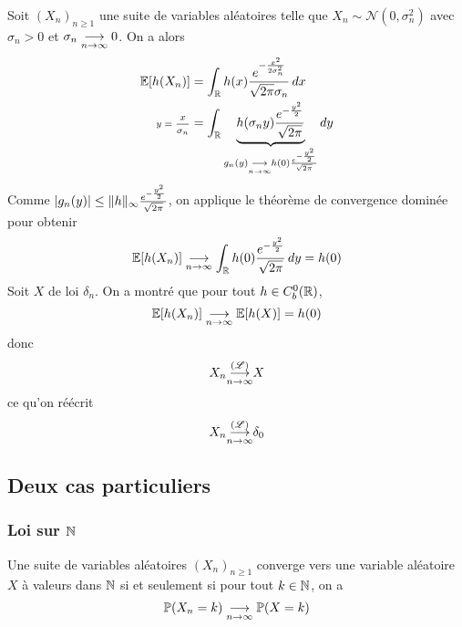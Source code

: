 \begin{example}
    Soit \({(X_n)}_{n\geq 1}\) une suite de variables aléatoires
    telle que \(X_n\sim\mathcal N(0,\sigma_n^2)\) avec \(\sigma_n> 0\)
    et \(\sigma_n\underset{n\to\infty}{\longrightarrow} 0\). On a alors
    \begin{equation*}
        \begin{aligned}
            \mathbb{E}[h(X_n)]
            &= \int_{\mathbb{R}} h(x) \frac{e^{-\frac{x^2}{2\sigma_n^2}}}{\sqrt{2\pi}\sigma_n}  \mathop{}\!{d} x\\
            \text{\scriptsize{\(y=\frac{x}{\sigma_n}\)}}&= \int_{\mathbb{R}} \underbrace{h(\sigma_n y) \frac{e^{-\frac{y^2}{2}}}{\sqrt{2\pi}}}_{g_n(y)\underset{n\to\infty}{\longrightarrow} h(0) \frac{e^{-\frac{y^2}{2}}}{\sqrt{2\pi}}} \mathop{}\!{d} y\\
        \end{aligned}
    \end{equation*}
    Comme \(|g_n(y)|\leq \mathopen{}\left\|h\right\|\mathclose{}_{\infty} \frac{e^{-\frac{y^2}{2}}}{\sqrt{2\pi}}\), on
    applique le théorème de convergence dominée pour obtenir
    \begin{equation*}
        \mathbb{E}[h(X_n)] \underset{n\to\infty}{\longrightarrow} \int_{\mathbb{R}} h(0) \frac{e^{-\frac{y^2}{2}}}{\sqrt{2\pi}} \mathop{}\!{d} y= h(0)
    \end{equation*}
    Soit \(X\) de loi \(\delta_n\). On a montré que pour tout \(h\in C_b^0(\mathbb{R})\),
    \begin{equation*}
        \mathbb{E}[h(X_n)] \underset{n\to\infty}{\longrightarrow} \mathbb{E}[h(X)]=h(0)
    \end{equation*}
    donc
    \begin{equation*}
        X_n \underset{n\to\infty}{{\overset{(\mathscr{L})}{\longrightarrow}}} X
    \end{equation*}
    ce qu'on réécrit
    \begin{equation*}
        X_n \underset{n\to\infty}{{\overset{(\mathscr{L})}{\longrightarrow}}} \delta_0
    \end{equation*}
\end{example}

\subsection{Deux cas particuliers}

\subsubsection{Loi sur \(\mathbb{N}\)}

\begin{proposition}
    Une suite de variables aléatoires \({(X_n)}_{n\geq 1}\) converge 
    vers une variable aléatoire \(X\) à valeurs dans \(\mathbb{N}\) si et seulement
    si pour tout \(k\in\mathbb{N}\), on a
    \begin{equation*}
        \mathbb{P}(X_n = k) \underset{n\to\infty}{\longrightarrow} \mathbb{P}(X = k)
    \end{equation*}
\end{proposition}

